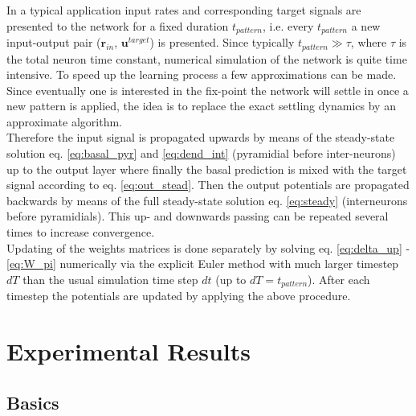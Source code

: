 \documentclass[12pt,a4paper]{article}
\begin{document}
In a typical application input rates and corresponding target signals are presented to the network for a fixed duration $t_{pattern}$, i.e. every $t_{pattern}$ a new input-output pair ($\bm{r}_{in}$, $\bm{u}^{target}$) is presented. Since typically $t_{pattern}\gg\tau$, where $\tau$ is the total neuron time constant, numerical simulation of the network is quite time intensive. To speed up the learning process a few approximations can be made. Since eventually one is interested in the fix-point the network will settle in once a new pattern is applied, the idea is to replace the exact settling dynamics by an approximate algorithm.\\
Therefore the input signal is propagated upwards by means of the steady-state solution eq. \eqref{eq:basal_pyr} and \eqref{eq:dend_int} (pyramidial before inter-neurons) up to the output layer where finally the basal prediction is mixed with the target signal according to eq. \eqref{eq:out_stead}. Then the output potentials are propagated backwards by means of the full steady-state solution eq. \eqref{eq:steady} (interneurons before pyramidials). This up- and downwards passing can be repeated several times to increase convergence. \\
Updating of the weights matrices is done separately by solving eq. \eqref{eq:delta_up} - \eqref{eq:W_pi} numerically via the explicit Euler method with much larger timestep $dT$ than the usual simulation time step $dt$ (up to $dT=t_{pattern}$). After each timestep the potentials are updated by applying the above procedure. 


\section{Experimental Results}

\subsection{Basics}
\end{document}
